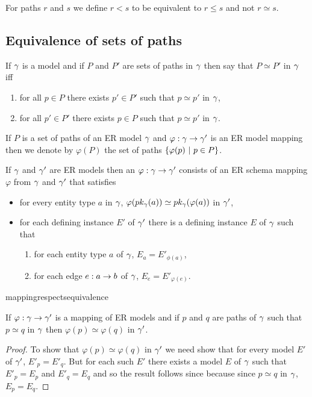 \noindent For paths $r$ and $s$ we define $r < s$ to be equivalent to $r \leq s$ and not $r \simeq s$. \\

\subsection{Equivalence of sets of paths}
\begin{definition}
If $\gamma$ is a model and if $P$ and $P'$ are sets of paths in $\gamma$ then say that
$P \simeq P'$ in $\gamma$ iff
\begin{enumerate}
\item for all $p \in P$ there exists $p' \in P'$ such that $p \simeq p'$ in $\gamma$,
\item for all $p' \in P'$ there exists $p \in P$ such that $p \simeq p'$ in $\gamma$.
\end{enumerate} 
\end{definition}

If $P$ is a set of paths of an ER model $\gamma$ and $\varphi : \gamma \rightarrow \gamma'$ is an ER model mapping then we denote by $\varphi(P)$ the set of paths
$\left\{\varphi(p) \ \middle|\ p \in P\right\}$.

\begin{definition}
\label{ERmodelmapping}
If $\gamma$ and  $\gamma'$ are ER models then an 
$\varphi : \gamma \rightarrow \gamma'$ consists of an ER schema mapping $\varphi$ from $\gamma$ and  $\gamma'$ that satisfies
\begin{itemize}
\item for every entity type $a$ in $\gamma$, $\varphi(pk_{\gamma}(a)) \simeq pk_{\gamma}(\varphi(a))$
in $\gamma'$,
\item  for each defining instance $E'$  of $\gamma'$ there is a defining instance $E$ of $\gamma$ such that
\begin{enumerate}
\item for each entity type $a$ of $\gamma$, $E_a = E'_{\phi(a)}$,
\item for each edge $e:a \rightarrow b$ of $\gamma$, $E_e = E'_{\varphi(e)}$.
\end{enumerate} 
\end{itemize}
\end{definition}

mappingrespectsequivalence
\begin{lemma}
\label{mappingrespectsequivalence}
If $\varphi: \gamma \rightarrow \gamma'$ is a mapping of ER models and
if $p$ and $q$ are paths of $\gamma$ such that $p \simeq q$ in $\gamma$ then $\varphi(p) \simeq \varphi(q)$ in $\gamma'$.
\end{lemma}
\begin{proof}
To show that $\varphi(p) \simeq \varphi(q)$ in $\gamma'$ we need show that for every model $E'$ of $\gamma'$, $E'_p=E'_q$. But for each such $E'$ there exists a model $E$ of $\gamma$ such that $E'_p=E_p$ and $E'_q=E_q$ and so the result follows since because since $p\simeq q$ in $\gamma$, $E_p=E_q$.
\end{proof}
